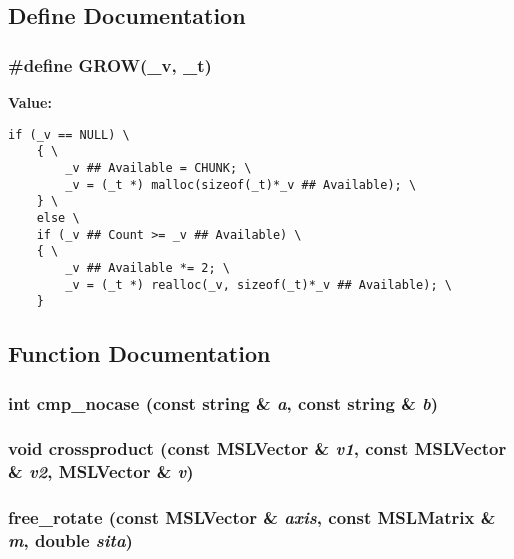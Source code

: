 \subsection{Define Documentation}
\subsubsection{\setlength{\rightskip}{0pt plus 5cm}\#define GROW(\_\-v, \_\-t)}\label{renderglobj_8C_a0}


{\bf Value:}

\footnotesize\begin{verbatim}if (_v == NULL) \
    { \
        _v ## Available = CHUNK; \
        _v = (_t *) malloc(sizeof(_t)*_v ## Available); \
    } \
    else \
    if (_v ## Count >= _v ## Available) \
    { \
        _v ## Available *= 2; \
        _v = (_t *) realloc(_v, sizeof(_t)*_v ## Available); \
    }\end{verbatim}\normalsize 


\subsection{Function Documentation}
\subsubsection{\setlength{\rightskip}{0pt plus 5cm}int cmp\_\-nocase (const string \& {\em a}, const string \& {\em b})}\label{renderglobj_8C_a20}


\subsubsection{\setlength{\rightskip}{0pt plus 5cm}void crossproduct (const {\bf MSLVector} \& {\em v1}, const {\bf MSLVector} \& {\em v2}, {\bf MSLVector} \& {\em v})}\label{renderglobj_8C_a11}


\subsubsection{\setlength{\rightskip}{0pt plus 5cm}{\bf MSLMatrix} free\_\-rotate (const {\bf MSLVector} \& {\em axis}, const {\bf MSLMatrix} \& {\em m}, double {\em sita})}\label{renderglobj_8C_a16}


